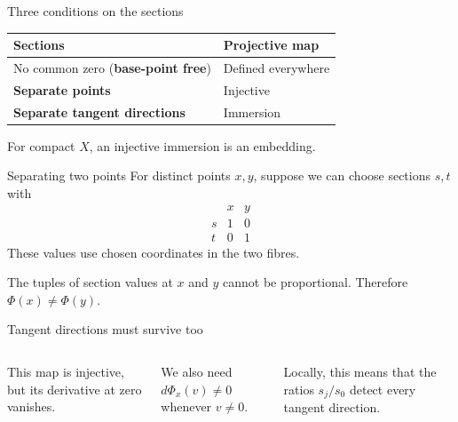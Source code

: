 \begin{frame}{Three conditions on the sections}
\begin{center}
\renewcommand{\arraystretch}{1.9}
\begin{tabular}{ll}
Sections & Projective map\\\hline
No common zero (\textbf{base-point free}) & Defined everywhere\\
\textbf{Separate points} & Injective\\
\textbf{Separate tangent directions} & Immersion
\end{tabular}
\end{center}
\par\bigskip
For compact \(X\), an injective immersion is an embedding.
\end{frame}

\begin{frame}{Separating two points}
For distinct points \(x,y\), suppose we can choose sections \(s,t\) with
\[
\begin{array}{c|cc}
 & x & y\\\hline
s & 1 & 0\\
t & 0 & 1
\end{array}
\]
These values use chosen coordinates in the two fibres.
\par\bigskip
The tuples of section values at \(x\) and \(y\) cannot be proportional.
Therefore \(\Phi(x)\ne\Phi(y)\).
\end{frame}

\begin{frame}{Tangent directions must survive too}
\begin{columns}[c]
\centering
{}
This map is injective, but its derivative at zero vanishes.
\par\bigskip
We also need \(d\Phi_x(v)\ne0\) whenever \(v\ne0\).
\par\bigskip
Locally, this means that the ratios \(s_j/s_0\) detect every tangent direction.
\end{columns}
\end{frame}

